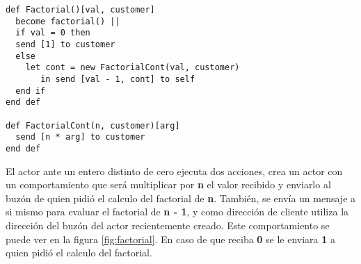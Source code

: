 \documentclass[fleqn]{article}
\begin{document}
\begin{lstlisting}[language=sal, style=simple]
def Factorial()[val, customer]
  become factorial() ||
  if val = 0 then
  send [1] to customer
  else
    let cont = new FactorialCont(val, customer)
       in send [val - 1, cont] to self
  end if 
end def

def FactorialCont(n, customer)[arg] 
  send [n * arg] to customer
end def
\end{lstlisting}

El actor ante un entero distinto de cero ejecuta dos acciones, crea un actor con
un comportamiento que será multiplicar por \textbf{n} el valor recibido y
enviarlo al buzón de quien pidió el calculo del factorial de \textbf{n}.
También, se envía un mensaje a si mismo para evaluar el factorial de \textbf{n -
  1}, y como dirección de cliente utiliza la dirección del buzón del actor
recientemente creado. Este comportamiento se puede ver en la figura \ref{fig:factorial}.
En caso de que reciba \textbf{0} se le enviara \textbf{1} a quien pidió el
calculo del factorial.
\end{document}
